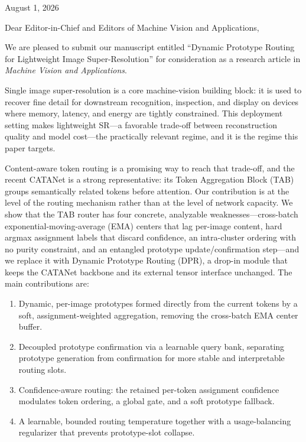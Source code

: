 \documentclass[11pt]{article}
\begin{document}
\begin{flushright}
August 1, 2026
\end{flushright}

\noindent Dear Editor-in-Chief and Editors of Machine Vision and Applications,

\medskip
\noindent We are pleased to submit our manuscript entitled ``Dynamic Prototype Routing for
Lightweight Image Super-Resolution'' for consideration as a research article in
\emph{Machine Vision and Applications}.

Single image super-resolution is a core machine-vision building block: it is used to
recover fine detail for downstream recognition, inspection, and display on devices where
memory, latency, and energy are tightly constrained. This deployment setting makes
lightweight SR---a favorable trade-off between reconstruction quality and model cost---the
practically relevant regime, and it is the regime this paper targets.

Content-aware token routing is a promising way to reach that trade-off, and the recent
CATANet is a strong representative: its Token Aggregation Block (TAB) groups semantically
related tokens before attention. Our contribution is at the level of the routing mechanism
rather than at the level of network capacity. We show that the TAB router has four
concrete, analyzable weaknesses---cross-batch exponential-moving-average (EMA) centers that
lag per-image content, hard argmax assignment labels that discard confidence, an
intra-cluster ordering with no purity constraint, and an entangled prototype
update/confirmation step---and we replace it with Dynamic Prototype Routing (DPR), a
drop-in module that keeps the CATANet backbone and its external tensor interface unchanged.
The main contributions are:

\begin{enumerate}[leftmargin=2.2em,itemsep=2pt,topsep=4pt]
  \item Dynamic, per-image prototypes formed directly from the current tokens by a soft,
  assignment-weighted aggregation, removing the cross-batch EMA center buffer.
  \item Decoupled prototype confirmation via a learnable query bank, separating prototype
  generation from confirmation for more stable and interpretable routing slots.
  \item Confidence-aware routing: the retained per-token assignment confidence modulates
  token ordering, a global gate, and a soft prototype fallback.
  \item A learnable, bounded routing temperature together with a usage-balancing
  regularizer that prevents prototype-slot collapse.
\end{enumerate}
\end{document}
